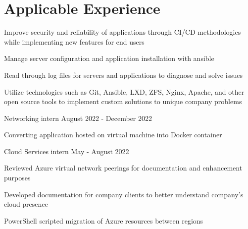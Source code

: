 \documentclass[]{deedy-resume-reversed}
\begin{document}
\begin{minipage}[t]{0.58\textwidth}

\section{Applicable Experience}

\vspace{\topsep} %
\begin{tightemize}
\item Improve security and reliability of applications through CI/CD methodologies while implementing new features for end users
\item Manage server configuration and application installation with ansible
\item Read through log files for servers and applications to diagnose and solve issues
\item Utilize technologies such as Git, Ansible, LXD, ZFS, Nginx, Apache, and other open source tools to implement custom solutions to unique company problems
\end{tightemize}
\sectionsep

\begin{tightemize}
\item Networking intern August 2022 - December 2022
\item Converting application hosted on virtual machine into Docker container
\item Cloud Services intern May - August 2022
\item Reviewed Azure virtual network peerings for documentation and enhancement purposes
\item Developed documentation for company clients to better understand company's cloud presence
\item PowerShell scripted migration of Azure resources between regions
\end{tightemize}
\sectionsep


\end{minipage}
\end{document}
